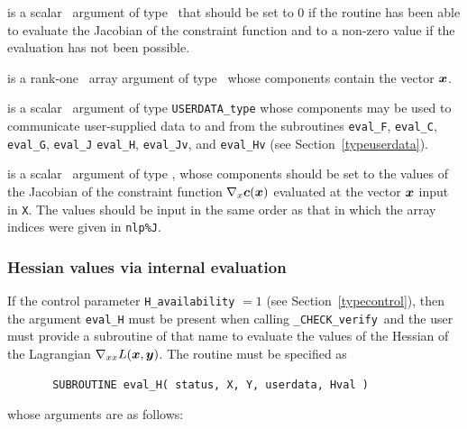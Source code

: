 \documentclass{galahad}
\newcommand{\packagename}{CHECK}
\newcommand{\fullpackagename}{\libraryname\_\packagename}
\newcommand{\solver}{{\tt \fullpackagename\_verify}}
\begin{document}
\begin{description}
 is a scalar \intentout\ argument of type \integer\
that should be set to 0 if the routine has been able to evaluate
the Jacobian of the constraint function
and to a non-zero value if the evaluation has not been possible.

 is a rank-one \intentin\ array argument of type \realdp\
whose components contain the vector ${\bm{x}}$.

 is a scalar \intentinout\ argument of type 
{\tt USERDATA\_type} whose components may be used
to communicate user-supplied data to and from the
subroutines {\tt eval\_F}, {\tt eval\_C}, {\tt eval\_G}, {\tt eval\_J}
{\tt eval\_H}, {\tt eval\_Jv}, and {\tt eval\_Hv} 
(see Section~\ref{typeuserdata}).

 is a scalar \intentout\ argument of type \realdp,
whose components should be set to the values of the Jacobian
of the constraint function $\nabla_x {\bm{c}}({\bm{x}})$
evaluated at the vector ${\bm{x}}$ input in {\tt X}. The values should
be input in the same order as that in which the array indices were
given in {\tt nlp\%J}.

\end{description}


\subsubsection{Hessian values via internal evaluation\label{hfv}}

If the control parameter {\tt H\_availability} $=1$ (see
Section~\ref{typecontrol}), then the argument {\tt eval\_H} must be
present when calling \solver\ and the
user must provide a subroutine of that name to evaluate the
values of the Hessian of the Lagrangian $\nabla_{xx} L({\bm{x}},{\bm{y}})$.
The routine must be specified as

\def\baselinestretch{0.8}
{\tt \begin{verbatim}
       SUBROUTINE eval_H( status, X, Y, userdata, Hval ) \end{verbatim} }
\def\baselinestretch{1.0}
\noindent whose arguments are as follows:
\end{document}
